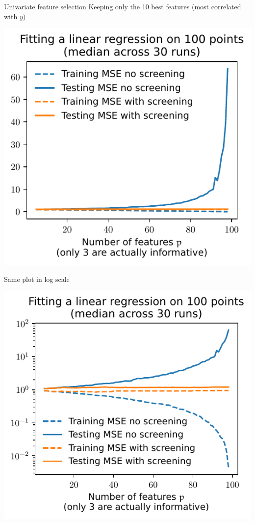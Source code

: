 \documentclass[presentation,mathserif,table]{beamer}
\begin{document}
\begin{frame}[label={sec:orge8dbcce}]{Univariate feature selection}
Keeping only the 10 best features (most correlated with \(y\))
\begin{center}
\includegraphics[height=.7\textheight]{figures/generated/ridge_overfitting/mse_with_dim_reduction.pdf}
\end{center}
\end{frame}

\begin{frame}[label={sec:org2d8934d}]{Same plot in log scale}
\begin{center}
\includegraphics[height=.7\textheight]{figures/generated/ridge_overfitting/mse_with_dim_reduction_log.pdf}
\end{center}
\end{frame}
\end{document}
